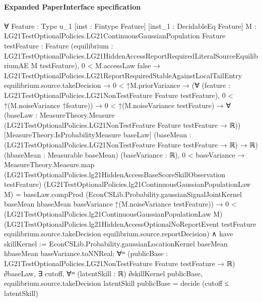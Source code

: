 \documentclass[10pt]{article}
\begin{document}
\paragraph{Expanded PaperInterface specification}
\begin{ReviewVerbatim}
∀ {Feature : Type u_1} [inst : Fintype Feature] [inst_1 : DecidableEq Feature]
  {M : LG21TestOptionalPolicies.LG21ContinuousGaussianPopulation Feature} {testFeature : Feature}
  (equilibrium : LG21TestOptionalPolicies.LG21HiddenAccessReportRequiredLiteralSourceEquilibriumAE M testFeature),
  0 < M.accessLaw {false} →
    LG21TestOptionalPolicies.LG21ReportRequiredStableAgainstLocalTailEntry equilibrium.source.takeDecision →
      0 < ↑M.priorVariance →
        (∀ (feature : LG21TestOptionalPolicies.LG21NonTestFeature Feature testFeature),
            0 < ↑(M.noiseVariance ↑feature)) →
          0 < ↑(M.noiseVariance testFeature) →
            ∀ (baseLaw : MeasureTheory.Measure (LG21TestOptionalPolicies.LG21NonTestFeature Feature testFeature → ℝ))
              [MeasureTheory.IsProbabilityMeasure baseLaw]
              (baseMean : (LG21TestOptionalPolicies.LG21NonTestFeature Feature testFeature → ℝ) → ℝ)
              (hbaseMean : Measurable baseMean) (baseVariance : ℝ),
              0 < baseVariance →
                MeasureTheory.Measure.map
                      (LG21TestOptionalPolicies.lg21HiddenAccessBaseScoreSkillObservation testFeature)
                      (LG21TestOptionalPolicies.lg21ContinuousGaussianPopulationLaw M) =
                    baseLaw.compProd
                      (EconCSLib.Probability.gaussianSignalJointKernel baseMean hbaseMean baseVariance
                        ↑(M.noiseVariance testFeature)) →
                  0 <
                      (LG21TestOptionalPolicies.lg21ContinuousGaussianPopulationLaw M)
                        (LG21TestOptionalPolicies.lg21HiddenAccessOptionalNoReportEvent testFeature
                          equilibrium.source.takeDecision equilibrium.source.reportDecision) ∧
                    have skillKernel :=
                      EconCSLib.Probability.gaussianLocationKernel baseMean hbaseMean baseVariance.toNNReal;
                    ∀ᵐ (publicBase : LG21TestOptionalPolicies.LG21NonTestFeature Feature testFeature → ℝ) ∂baseLaw,
                      ∃ cutoff,
                        ∀ᵐ (latentSkill : ℝ) ∂skillKernel publicBase,
                          equilibrium.source.takeDecision latentSkill publicBase = decide (cutoff ≤ latentSkill)
\end{ReviewVerbatim}
\end{document}
